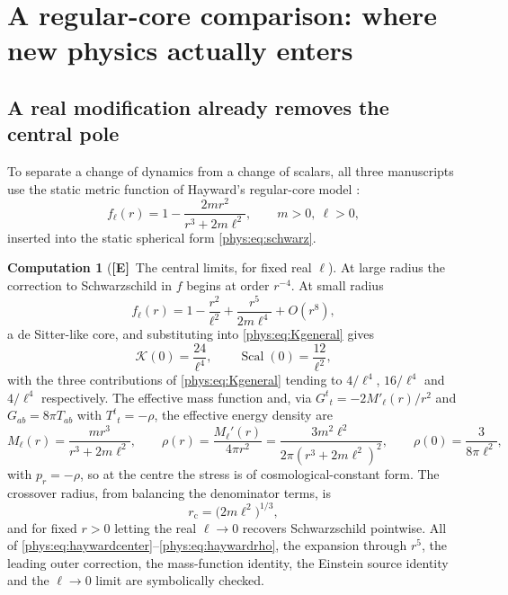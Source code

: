 \documentclass[11pt,letterpaper]{article}
\numberwithin{equation}{section}
\theoremstyle{definition}
\newtheorem{computation}[theorem]{Computation}
\theoremstyle{remark}
\newcommand{\Kret}{\mathcal K}
\DeclareMathOperator{\Scal}{Scal}
\newcommand{\TE}{\textcolor{TierE}{\textsf{\bfseries[E]}}}
\begin{document}
\section{A regular-core comparison: where new physics actually enters}
\label{phys:sec:core}

\subsection{A real modification already removes the central pole}
\label{phys:sub:hayward}

To separate a change of dynamics from a change of scalars, all three
manuscripts use the static metric function of Hayward's regular-core model
\cite{phys:Hayward}:
\begin{equation}\label{phys:eq:hayward}
f_{\ell}(r)=1-\frac{2mr^{2}}{r^{3}+2m\ell^{2}},\qquad m>0,\ \ell>0,
\end{equation}
inserted into the static spherical form \eqref{phys:eq:schwarz}.

\begin{computation}[\TE\ The central limits, for fixed real $\ell$]
\label{phys:comp:hayward}
At large radius the correction to Schwarzschild in $f$ begins at order
$r^{-4}$. At small radius
\begin{equation}\label{phys:eq:haywardcenter}
f_{\ell}(r)=1-\frac{r^{2}}{\ell^{2}}+\frac{r^{5}}{2m\ell^{4}}+O(r^{8}),
\end{equation}
a de Sitter-like core, and substituting into \eqref{phys:eq:Kgeneral} gives
\begin{equation}\label{phys:eq:haywardK}
\Kret(0)=\frac{24}{\ell^{4}},
\qquad \Scal(0)=\frac{12}{\ell^{2}},
\end{equation}
with the three contributions of \eqref{phys:eq:Kgeneral} tending to
$4/\ell^{4}$, $16/\ell^{4}$ and $4/\ell^{4}$ respectively. The effective mass
function and, via $G^{t}{}_{t}=-2M'_{\ell}(r)/r^{2}$ and $G_{ab}=8\pi T_{ab}$
with $T^{t}{}_{t}=-\rho$, the effective energy density are
\begin{equation}\label{phys:eq:haywardrho}
M_{\ell}(r)=\frac{mr^{3}}{r^{3}+2m\ell^{2}},
\qquad
\rho(r)=\frac{M_{\ell}'(r)}{4\pi r^{2}}
=\frac{3m^{2}\ell^{2}}{2\pi(r^{3}+2m\ell^{2})^{2}},
\qquad \rho(0)=\frac{3}{8\pi\ell^{2}},
\end{equation}
with $p_{r}=-\rho$, so at the centre the stress is of cosmological-constant
form. The crossover radius, from balancing the denominator terms, is
\begin{equation}\label{phys:eq:haywardcrossover}
r_{\mathrm c}=\bigl(2m\ell^{2}\bigr)^{1/3},
\end{equation}
and for fixed $r>0$ letting the real $\ell\to0$ recovers Schwarzschild
pointwise. All of \eqref{phys:eq:haywardcenter}--\eqref{phys:eq:haywardrho},
the expansion through $r^{5}$, the leading outer correction, the mass-function
identity, the Einstein source identity and the $\ell\to0$ limit are
symbolically checked.
\end{computation}
\end{document}
